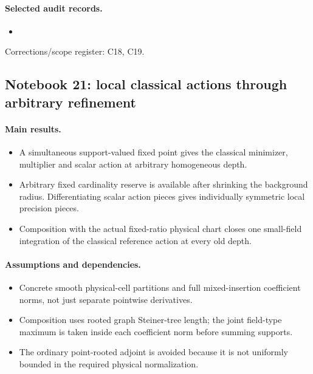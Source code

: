 \documentclass[11pt]{article}
\theoremstyle{remark}
\begin{document}
\paragraph{Selected audit records.}
\begingroup\small
\begin{itemize}
\item {}
\end{itemize}
\endgroup
Corrections/scope register: C18, C19.\par

\subsection{Notebook 21: local classical actions through arbitrary refinement}
\label{hnc-21}
\noindent{}\par

\paragraph{Main results.}
\begin{itemize}
\item A simultaneous support-valued fixed point gives the classical minimizer, multiplier and scalar action at arbitrary homogeneous depth.
\item Arbitrary fixed cardinality reserve is available after shrinking the background radius. Differentiating scalar action pieces gives individually symmetric local precision pieces.
\item Composition with the actual fixed-ratio physical chart closes one small-field integration of the classical reference action at every old depth.
\end{itemize}

\paragraph{Assumptions and dependencies.}
\begin{itemize}
\item Concrete smooth physical-cell partitions and full mixed-insertion coefficient norms, not just separate pointwise derivatives.
\item Composition uses rooted graph Steiner-tree length; the joint field-type maximum is taken inside each coefficient norm before summing supports.
\item The ordinary point-rooted adjoint is avoided because it is not uniformly bounded in the required physical normalization.
\end{itemize}
\end{document}
